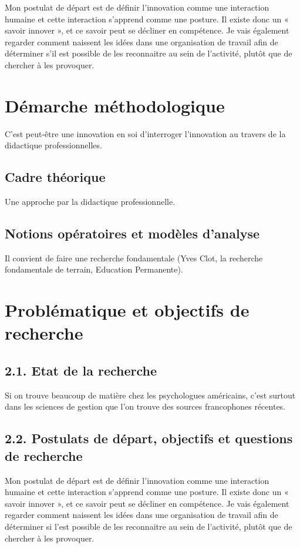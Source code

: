 \documentclass{article}
\begin{document}
Mon postulat de départ est de définir l'innovation comme une interaction humaine et cette interaction s'apprend comme une posture. Il existe donc un « savoir innover », et ce savoir peut se décliner en compétence. 
Je vais également regarder comment naissent les idées dans une organisation de travail afin de déterminer s'il est possible de les reconnaitre au sein de l'activité, plutôt que de chercher à les provoquer. 

\section{Démarche méthodologique}

C'est peut-être une innovation en soi d'interroger l'innovation au travers de la didactique professionnelles. 

\subsection{Cadre théorique}

Une approche par la didactique professionnelle.

\subsection{Notions opératoires et modèles d'analyse}

Il convient de faire une recherche fondamentale (Yves Clot, la recherche fondamentale de terrain, Education Permanente).

\section{Problématique et objectifs de recherche}

\subsection{2.1. Etat de la recherche}

Si on trouve beaucoup de matière chez les psychologues américains, c'est surtout dans les sciences de gestion que l'on trouve des sources francophones récentes. 

\subsection{2.2. Postulats de départ, objectifs et questions de recherche}

Mon postulat de départ est de définir l'innovation comme une interaction humaine et cette interaction s'apprend comme une posture. Il existe donc un « savoir innover », et ce savoir peut se décliner en compétence. 
Je vais également regarder comment naissent les idées dans une organisation de travail afin de déterminer si l'est possible de les reconnaitre au sein de l'activité, plutôt que de chercher à les provoquer. 
\end{document}
